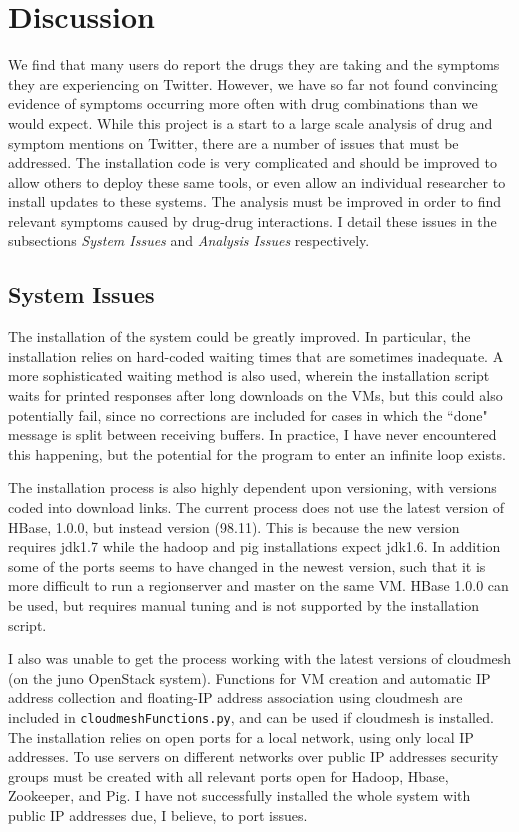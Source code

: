 \documentclass[letterpaper]{article}
\begin{document}
\section{Discussion}

We find that many users do report the drugs they are taking and the symptoms they are experiencing on Twitter. However, we have so far not found convincing evidence of symptoms occurring more often with drug combinations than we would expect. While this project is a start to a large scale analysis of drug and symptom mentions on Twitter, there are a number of issues that must be addressed. The installation code is very complicated and should be improved to allow others to deploy these same tools, or even allow an individual researcher to install updates to these systems. The analysis must be improved in order to find relevant symptoms caused by drug-drug interactions. I detail these issues in the subsections \textit{System Issues} and \textit{Analysis Issues} respectively.

\subsection{System Issues}
The installation of the system could be greatly improved. In particular, the installation relies on hard-coded waiting times that are sometimes inadequate. A more sophisticated waiting method is also used, wherein the installation script waits for printed responses after long downloads on the VMs, but this could also potentially fail, since no corrections are included for cases in which the ``done" message is split between receiving buffers. In practice, I have never encountered this happening, but the potential for the program to enter an infinite loop exists.

The installation process is also highly dependent upon versioning, with versions coded into download links. The current process does not use the latest version of HBase, 1.0.0, but instead version (98.11). This is because the new version requires jdk1.7 while the hadoop and pig installations expect jdk1.6. In addition some of the ports seems to have changed in the newest version, such that it is more difficult to run a regionserver and master on the same VM. HBase 1.0.0 can be used, but requires manual tuning and is not supported by the installation script. 

I also was unable to get the process working with the latest versions of cloudmesh (on the juno OpenStack system). Functions for VM creation and automatic IP address collection and floating-IP address association using cloudmesh are included in \lstinline|cloudmeshFunctions.py|, and can be used if cloudmesh is installed. The installation relies on open ports for a local network, using only local IP addresses. To use servers on different networks over public IP addresses security groups must be created with all relevant ports open for Hadoop, Hbase, Zookeeper, and Pig. I have not successfully installed the whole system with public IP addresses due, I believe, to port issues.
\end{document}
